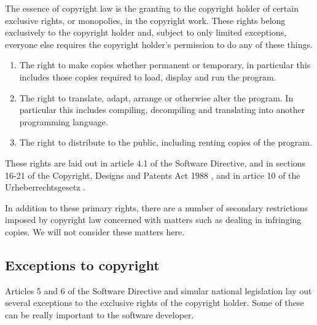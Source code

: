 \documentclass[a4paper,12pt]{article}
\newcommand{\CDPA}[1][]{Copyright, Designs and Patents Act 1988 #1\xspace}
\newcommand{\URG}[1][]{Urheberrechtsgesetz #1\xspace}
\begin{document}
The essence of copyright law is the granting to the copyright holder of
certain exclusive rights, or monopolies, in the copyright work. These rights
belong exclusively to the copyright holder and, subject to only limited
exceptions, everyone else requires the copyright holder's permission to do
any of these things.

\begin{enumerate}
\item The right to make copies whether permanent or temporary, in particular
  this includes those copies required to load, display and run the program.
\item The right to translate, adapt, arrange or otherwise alter the
  program. In particular this includes compiling, decompiling and translating
  into another programming language.
\item The right to distribute to the public, including renting copies of the
  program.
\end{enumerate}

These rights are laid out in article 4.1 of the Software Directive, and in
sections 16-21 of the \CDPA, and in artice 10 of the \URG. 

In addition to these primary rights, there are a number of secondary
restrictions imposed by copyright law concerned with matters such as dealing
in infringing copies. We will not consider these matters here.

\subsection{Exceptions to copyright}

Articles 5 and 6 of the Software Directive and simular national legislation lay out several 
exceptions to the exclusive rights of the copyright holder. Some of these
can be really important to the software developer.
\end{document}
